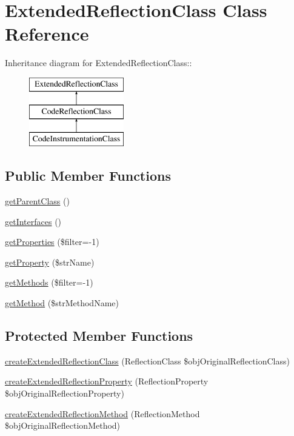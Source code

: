 \hypertarget{class_extended_reflection_class}{
\section{ExtendedReflectionClass Class Reference}
\label{class_extended_reflection_class}
}
Inheritance diagram for ExtendedReflectionClass::\begin{figure}[H]
\begin{center}
\leavevmode
\includegraphics[height=3cm]{class_extended_reflection_class}
\end{center}
\end{figure}
\subsection*{Public Member Functions}
\begin{CompactItemize}
\item 
\hyperlink{class_extended_reflection_class_0102234be653614459dc1588c13d6f2e}{getParentClass} ()
\item 
\hyperlink{class_extended_reflection_class_acd41ad982fee4953d8ad245ab7e4ec9}{getInterfaces} ()
\item 
\hyperlink{class_extended_reflection_class_343685a008d211bd41276c6042ea88ea}{getProperties} (\$filter=-1)
\item 
\hyperlink{class_extended_reflection_class_59a1bf8713bdaa9c0ada05f3bcff969a}{getProperty} (\$strName)
\item 
\hyperlink{class_extended_reflection_class_c747edd613c23881113d99316f12812d}{getMethods} (\$filter=-1)
\item 
\hyperlink{class_extended_reflection_class_c569f5e42707c39d576fc5cda820d233}{getMethod} (\$strMethodName)
\end{CompactItemize}
\subsection*{Protected Member Functions}
\begin{CompactItemize}
\item 
\hyperlink{class_extended_reflection_class_6b56ec198bc6a5b5a72076e4e7c19e29}{createExtendedReflectionClass} (ReflectionClass \$objOriginalReflectionClass)
\item 
\hyperlink{class_extended_reflection_class_bce271bf4f7b77b8b11986404241ab5c}{createExtendedReflectionProperty} (ReflectionProperty \$objOriginalReflectionProperty)
\item 
\hyperlink{class_extended_reflection_class_ec7c1d4b204b6e3a6291d3b867afb688}{createExtendedReflectionMethod} (ReflectionMethod \$objOriginalReflectionMethod)
\end{CompactItemize}


